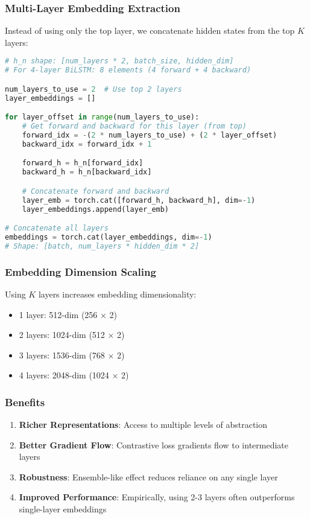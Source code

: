 \documentclass[12pt,a4paper]{article}
\begin{document}
\subsubsection{Multi-Layer Embedding Extraction}

Instead of using only the top layer, we concatenate hidden states from the top $K$ layers:

\begin{lstlisting}[language=Python, caption={Multi-Layer Embedding Extraction}]
# h_n shape: [num_layers * 2, batch_size, hidden_dim]
# For 4-layer BiLSTM: 8 elements (4 forward + 4 backward)

num_layers_to_use = 2  # Use top 2 layers
layer_embeddings = []

for layer_offset in range(num_layers_to_use):
    # Get forward and backward for this layer (from top)
    forward_idx = -(2 * num_layers_to_use) + (2 * layer_offset)
    backward_idx = forward_idx + 1

    forward_h = h_n[forward_idx]
    backward_h = h_n[backward_idx]

    # Concatenate forward and backward
    layer_emb = torch.cat([forward_h, backward_h], dim=-1)
    layer_embeddings.append(layer_emb)

# Concatenate all layers
embeddings = torch.cat(layer_embeddings, dim=-1)
# Shape: [batch, num_layers * hidden_dim * 2]
\end{lstlisting}

\subsubsection{Embedding Dimension Scaling}

Using $K$ layers increases embedding dimensionality:
\begin{itemize}
    \item 1 layer: 512-dim (256 × 2)
    \item 2 layers: 1024-dim (512 × 2)
    \item 3 layers: 1536-dim (768 × 2)
    \item 4 layers: 2048-dim (1024 × 2)
\end{itemize}

\subsubsection{Benefits}

\begin{enumerate}
    \item \textbf{Richer Representations}: Access to multiple levels of abstraction
    \item \textbf{Better Gradient Flow}: Contrastive loss gradients flow to intermediate layers
    \item \textbf{Robustness}: Ensemble-like effect reduces reliance on any single layer
    \item \textbf{Improved Performance}: Empirically, using 2-3 layers often outperforms single-layer embeddings
\end{enumerate}
\end{document}
